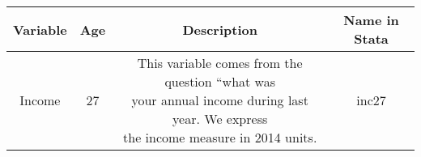 
\begin{tabular}{cccc} \hline \hline
Variable & Age & Description & Name in Stata \\ \hline
Income  & 27   & \specialcell[l]{This variable comes from the question ``what was  \\ your annual income during last year. We express \\ the income measure in 2014 units.} &  inc27 \\  \hline
\end{tabular}
